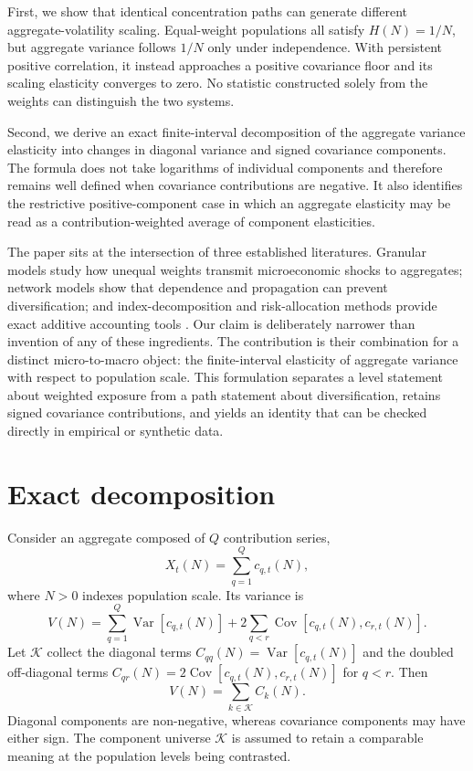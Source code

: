 \documentclass[a4paper,fleqn]{cas-dc}
\begin{document}
First, we show that identical concentration paths can generate different
aggregate-volatility scaling. Equal-weight populations all satisfy
$H(N)=1/N$, but aggregate variance follows $1/N$ only under independence.
With persistent positive correlation, it instead approaches a positive
covariance floor and its scaling elasticity converges to zero. No
statistic constructed solely from the weights can distinguish the two
systems.

Second, we derive an exact finite-interval decomposition of the aggregate
variance elasticity into changes in diagonal variance and signed
covariance components. The formula does not take logarithms of individual
components and therefore remains well defined when covariance
contributions are negative. It also identifies the restrictive
positive-component case in which an aggregate elasticity may be read as
a contribution-weighted average of component elasticities.

The paper sits at the intersection of three established literatures.
Granular models study how unequal weights transmit microeconomic shocks
to aggregates; network models show that dependence and propagation can
prevent diversification; and index-decomposition and risk-allocation
methods provide exact additive accounting tools
\citep{gabaix2011,network_placeholder,lmdi_placeholder,risk_decomposition_placeholder}.
Our claim is deliberately narrower than invention of any of these
ingredients. The contribution is their combination for a distinct
micro-to-macro object: the finite-interval elasticity of aggregate
variance with respect to population scale. This formulation separates a
level statement about weighted exposure from a path statement about
diversification, retains signed covariance contributions, and yields an
identity that can be checked directly in empirical or synthetic data.

\section{Exact decomposition}
\label{sec:exact_decomposition}

Consider an aggregate composed of $Q$ contribution series,
\begin{equation}
    X_t(N)=\sum_{q=1}^{Q}c_{q,t}(N),
\end{equation}
where $N>0$ indexes population scale. Its variance is
\begin{equation}
\label{eq:variance_accounting}
    V(N)
    =
    \sum_{q=1}^{Q}\operatorname{Var}\!\left[c_{q,t}(N)\right]
    +
    2\sum_{q<r}\operatorname{Cov}\!\left[c_{q,t}(N),c_{r,t}(N)\right].
\end{equation}
Let $\mathcal{K}$ collect the diagonal terms
$C_{qq}(N)=\operatorname{Var}[c_{q,t}(N)]$ and the doubled off-diagonal
terms
$C_{qr}(N)=2\operatorname{Cov}[c_{q,t}(N),c_{r,t}(N)]$ for $q<r$. Then
\begin{equation}
\label{eq:component_sum}
    V(N)=\sum_{k\in\mathcal{K}}C_k(N).
\end{equation}
Diagonal components are non-negative, whereas covariance components may
have either sign. The component universe $\mathcal{K}$ is assumed to
retain a comparable meaning at the population levels being contrasted.
\end{document}
